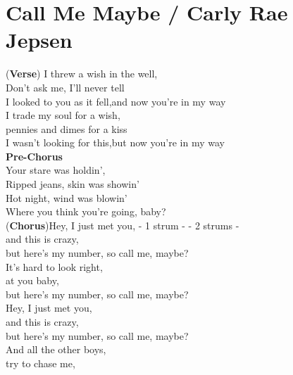 \section{Call Me Maybe / Carly Rae Jepsen}\label{sec:callmemaybe}

\Aminor
\Cmajor
\Fmajor
\Gmajor

(\textbf{Verse}) I threw a wish in the well,\\
Don't ask me, I'll never tell\\
I looked to you as it fell,and now you're in my way\\
I trade my soul for a wish,\\
pennies and dimes for a kiss        \\       
I wasn't looking for this,but now you're in my way\\
\textbf{Pre-Chorus}\\
Your stare was holdin',\\
Ripped jeans, skin was showin'\\
Hot night, wind was blowin'\\
Where you think you're going, baby?\\
(\textbf{Chorus})Hey, I just met you,  - 1 strum -   - 2 strums -      \\             
and this is crazy,                  \\       
but here's my number,   so call me, maybe?\\
It's hard to look right,       \\        
at you baby,                        \\ 
but here's my number,   so call me, maybe?\\
Hey, I just met you,      \\                
and this is crazy,                     \\    
but here's my number,    so call me, maybe?\\
And all the other boys,     \\               
try to chase me,           \\               
